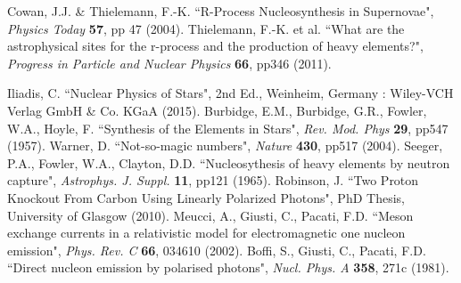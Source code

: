 \documentclass[a4paper,12pt]{article}
\begin{document}
\clearpage
\begin{thebibliography}{99}
 Cowan, J.J. \& Thielemann, F.-K. ``R-Process Nucleosynthesis in Supernovae", \textit{Physics Today} \textbf{57}, pp 47 (2004).
 Thielemann, F.-K. et al. ``What are the astrophysical sites for the r-process and the production of heavy elements?", \textit{Progress in Particle and Nuclear Physics} \textbf{66}, pp346 (2011).

 Iliadis, C. ``Nuclear Physics of Stars", 2nd Ed., Weinheim, Germany : Wiley-VCH Verlag GmbH \& Co. KGaA (2015).
 Burbidge, E.M., Burbidge, G.R., Fowler, W.A., Hoyle, F. ``Synthesis of the Elements in Stars", \textit{Rev. Mod. Phys} \textbf{29}, pp547 (1957).
 Warner, D. ``Not-so-magic numbers", \textit{Nature} \textbf{430}, pp517 (2004).
 Seeger, P.A., Fowler, W.A., Clayton, D.D. ``Nucleosythesis of heavy elements by neutron capture", \textit{Astrophys. J. Suppl.} \textbf{11}, pp121 (1965).
 Robinson, J. ``Two Proton Knockout From Carbon Using Linearly Polarized Photons", PhD Thesis, University of Glasgow (2010).
 Meucci, A., Giusti, C., Pacati, F.D. ``Meson exchange currents in a relativistic model for electromagnetic one nucleon emission", \textit{Phys. Rev. C} \textbf{66}, 034610 (2002).
 Boffi, S., Giusti, C., Pacati, F.D. ``Direct nucleon emission by polarised photons", \textit{Nucl. Phys. A} \textbf{358}, 271c (1981).

\end{thebibliography}
\end{document}
